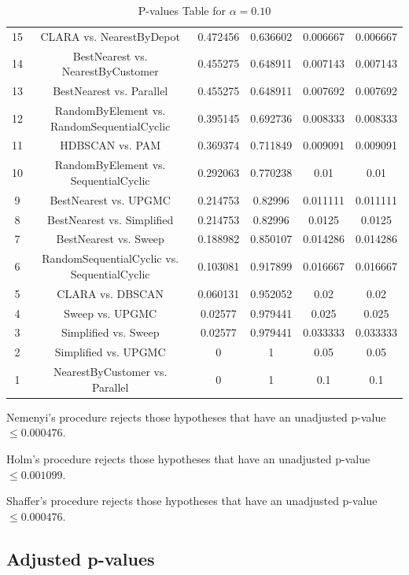 \documentclass[a4paper,10pt]{article}
\begin{document}
\begin{landscape}
\begin{table}[!htp]
\begin{tabular}{cccccc}
15&CLARA vs. NearestByDepot&0.472456&0.636602&0.006667&0.006667\\
14&BestNearest vs. NearestByCustomer&0.455275&0.648911&0.007143&0.007143\\
13&BestNearest vs. Parallel&0.455275&0.648911&0.007692&0.007692\\
12&RandomByElement vs. RandomSequentialCyclic&0.395145&0.692736&0.008333&0.008333\\
11&HDBSCAN vs. PAM&0.369374&0.711849&0.009091&0.009091\\
10&RandomByElement vs. SequentialCyclic&0.292063&0.770238&0.01&0.01\\
9&BestNearest vs. UPGMC&0.214753&0.82996&0.011111&0.011111\\
8&BestNearest vs. Simplified&0.214753&0.82996&0.0125&0.0125\\
7&BestNearest vs. Sweep&0.188982&0.850107&0.014286&0.014286\\
6&RandomSequentialCyclic vs. SequentialCyclic&0.103081&0.917899&0.016667&0.016667\\
5&CLARA vs. DBSCAN&0.060131&0.952052&0.02&0.02\\
4&Sweep vs. UPGMC&0.02577&0.979441&0.025&0.025\\
3&Simplified vs. Sweep&0.02577&0.979441&0.033333&0.033333\\
2&Simplified vs. UPGMC&0&1&0.05&0.05\\
1&NearestByCustomer vs. Parallel&0&1&0.1&0.1\\
\hline
\end{tabular}
\caption{P-values Table for $\alpha=0.10$}
\end{table}Nemenyi's procedure rejects those hypotheses that have an unadjusted p-value $\le0.000476$.

Holm's procedure rejects those hypotheses that have an unadjusted p-value $\le0.001099$.

Shaffer's procedure rejects those hypotheses that have an unadjusted p-value $\le0.000476$.

\pagebreak

\subsection{Adjusted p-values}


\end{landscape}
\end{document}
